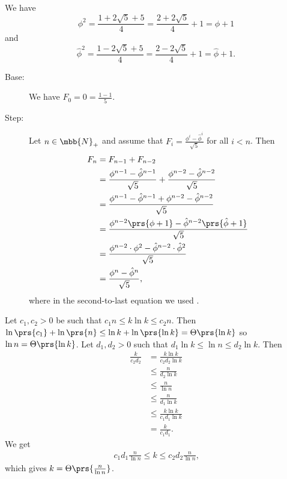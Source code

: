 \documentclass[oneside]{scrbook}
\theoremstyle{definition}
\begin{document}
\begin{exercise}\label{exercise:golden-ratio-equation}
We have
\[\phi^2 = \frac{1 + 2\sqrt{5} + 5}{4} = \frac{2 + 2 \sqrt{5}}{4} + 1 = \phi + 1\]
and
\[\hat{\phi}^2 = \frac{1 - 2 \sqrt{5} + 5}{4} = \frac{2 - 2 \sqrt{5}}{4} + 1 = \hat{\phi} + 1 \text{.}\]
\end{exercise}

\begin{exercise}
\begin{description}
\item[Base:]
We have $F_0 = 0 = \frac{1-1}{5}$.
\item[Step:]
Let $n \in \mbb{N}_+$ and assume that $F_i = \frac{\phi^i - \hat{\phi}^i}{\sqrt{5}}$ for all $i < n$.
Then
\begin{align*}
F_n &= F_{n-1} + F_{n-2}
\\&=
\frac{\phi^{n-1} - \hat{\phi}^{n-1}}{\sqrt{5}} + \frac{\phi^{n-2} - \hat{\phi}^{n-2}}{\sqrt{5}}
\\&=
\frac{\phi^{n-1} - \hat{\phi}^{n-1} + \phi^{n-2} - \hat{\phi}^{n-2}}{\sqrt{5}}
\\&=
\frac{\phi^{n-2} \prs{\phi + 1} - \hat{\phi}^{n-2} \prs{\hat{\phi}+1}}{\sqrt{5}}
\\&=
\frac{\phi^{n-2} \cdot \phi^2 - \hat{\phi}^{n-2} \cdot \hat{\phi}^2}{\sqrt{5}}
\\&=
\frac{\phi^n - \hat{\phi}^n}{\sqrt{5}} \text{,}
\end{align*}
where in the second-to-last equation we used .
\end{description}
\end{exercise}

\begin{exercise}
Let $c_1, c_2 > 0$ be such that $c_1 n \leq k \ln k \leq c_2 n$. Then $\ln\prs{c_1} + \ln\prs{n} \leq \ln k + \ln\prs{\ln k} = \Theta\prs{\ln k}$ so $\ln n = \Theta\prs{\ln k}$. Let $d_1, d_2 > 0$ such that $d_1 \ln k \leq \ln n \leq d_2 \ln k$. Then
\begin{align*}
\frac{k}{c_2 d_2} &=
\frac{k \ln k}{c_2 d_2 \ln k}
\\&\leq
\frac{n}{d_2 \ln k}
\\&\leq
\frac{n}{\ln n}
\\&\leq
\frac{n}{d_1 \ln k}
\\&\leq
\frac{k \ln k}{c_1 d_1 \ln k}
\\&=
\frac{k}{c_1 d_1} \text{.}
\end{align*}
We get
\begin{align*}
c_1 d_1 \frac{n}{\ln n} \leq k \leq c_2 d_2 \frac{n}{\ln n} \text{,}
\end{align*}
which gives $k = \Theta\prs{\frac{n}{\ln n}}$.
\end{exercise}
\end{document}
